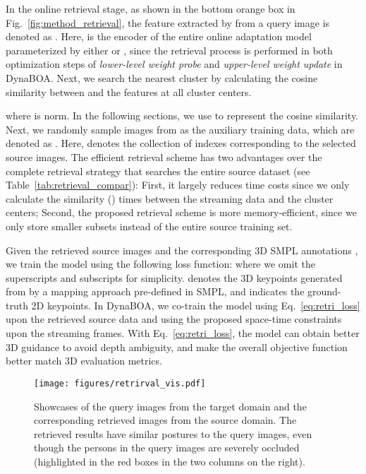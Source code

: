 \documentclass[10pt,journal,compsoc]{IEEEtran}
\let\MYoriglatexcaption\caption
\renewcommand{\caption}[2][\relax]{\MYoriglatexcaption[#2]{#2}}
\newcommand{\eqn}[1]{Eq.~\eqref{#1}}
\newcommand{\tab}[1]{Table~\ref{#1}}
\newcommand{\fig}[1]{Fig.~\ref{#1}}
\begin{document}
In the online retrieval stage, as shown in the bottom orange box in \fig{fig:method_retrieval}, the feature extracted by  from a query image  is denoted as . 
Here,  is the encoder of the entire online adaptation model parameterized by either  or , since the retrieval process is performed in both optimization steps of \textit{lower-level weight probe} and \textit{upper-level weight update} in DynaBOA. 
Next, we search the nearest cluster  by calculating the cosine similarity between  and the features at all cluster centers. 

where  is  norm. In the following sections, we use  to represent the cosine similarity.
Next, we randomly sample  images from  as the auxiliary training data, which are denoted as . Here,  denotes the collection of indexes corresponding to the  selected source images.
The efficient retrieval scheme has two advantages over the complete retrieval strategy that searches the entire source dataset (see \tab{tab:retrieval_compar}): First, it largely reduces time costs since we only calculate the similarity  () times between the streaming data and the cluster centers; Second, the proposed retrieval scheme is more memory-efficient, since we only store smaller subsets instead of the entire source training set. 



Given the retrieved source images  and the corresponding 3D SMPL annotations , we train the model  using the following loss function: 
where we omit the superscripts and subscripts for simplicity. 
 denotes the 3D keypoints generated from  by a mapping approach pre-defined in SMPL, and  indicates the ground-truth 2D keypoints. 
In DynaBOA, we co-train the model using \eqn{eq:retri_loss} upon the retrieved source data and using the proposed space-time constraints upon the streaming frames.
With \eqn{eq:retri_loss}, the model can obtain better 3D guidance to avoid depth ambiguity, and make the overall objective function better match 3D evaluation metrics.

\begin{figure}[t]
    \centering
    \texttt{[image: figures/retrirval\_vis.pdf]}
    \vspace{-15pt}
    \caption{Showcases of the query images from the target domain and the corresponding retrieved images from the source domain. The retrieved results have similar postures to the query images, even though the persons in the query images are severely occluded (highlighted in the red boxes in the two columns on the right).
    }
    \label{fig:retrieval_vis}
\end{figure}
\end{document}
